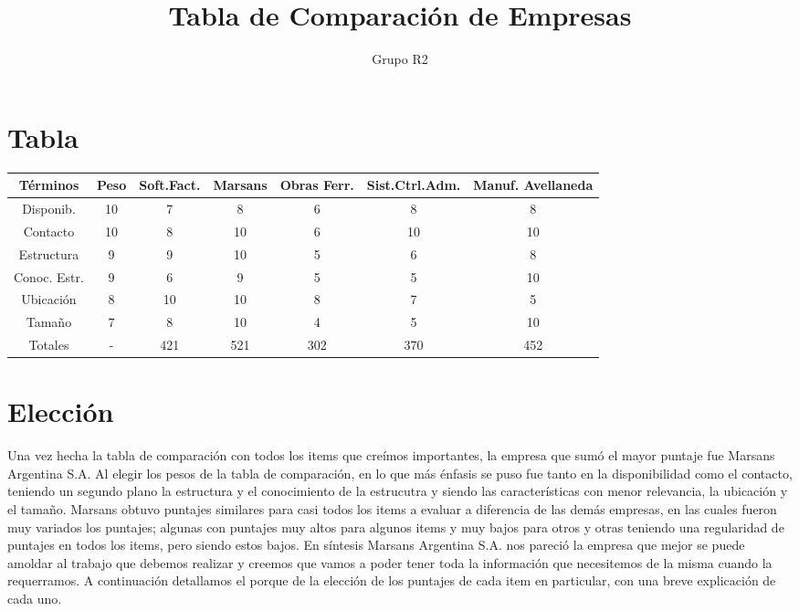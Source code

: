 \documentclass[12pt,a4paper,spanish]{article}
\begin{document}
 

\pagestyle{plain}
\title{Tabla de Comparaci\'{o}n de Empresas} 
\author{Grupo R2} 
\maketitle 
\newpage
\tableofcontents
\newpage
\section{Tabla}
\small
\begin{center}
\begin{tabular}{|| c | c | c | c | c | c | c ||}
\hline
\hline
T\'{e}rminos & Peso & Soft.Fact. & Marsans & Obras Ferr. & Sist.Ctrl.Adm. & Manuf. Avellaneda\\
\hline
Disponib.  & 10 & 7 & 8 & 6 & 8 & 8 \\
\hline
Contacto   & 10 & 8 & 10 & 6 & 10 & 10 \\
\hline
Estructura & 9 & 9 & 10 & 5 & 6 & 8 \\
\hline
Conoc. Estr. & 9 & 6 & 9 & 5 & 5 & 10 \\
\hline
Ubicaci\'{o}n & 8 & 10 & 10 & 8 & 7 & 5 \\
\hline
Tama\~{n}o   & 7 & 8 & 10 & 4 & 5 & 10 \\
\hline
\hline
Totales & - & 421 & 521 & 302 & 370 & 452 \\
\hline

\end{tabular}
\end{center}

\section{Elecci\'on}
Una vez hecha la tabla de comparaci\'{o}n con todos los items que cre\'imos importantes, la empresa que sum\'o el mayor puntaje fue Marsans Argentina S.A.
Al elegir los pesos de la tabla de comparaci\'{o}n, en lo que m\'as \'enfasis se puso fue tanto en la disponibilidad como el contacto, teniendo un segundo plano la estructura y el conocimiento de la estrucutra y siendo las caracter\'isticas con menor relevancia, la ubicaci\'on y el tama\~no.
Marsans obtuvo puntajes similares para casi todos los items a evaluar a diferencia de las dem\'{a}s empresas, en las cuales fueron muy variados los puntajes; algunas con puntajes muy altos para algunos items y muy bajos para otros y otras teniendo una regularidad de puntajes en todos los items, pero siendo estos bajos.
En s\'{i}ntesis Marsans Argentina S.A. nos pareci\'{o} la empresa que mejor se puede amoldar al trabajo que debemos realizar y creemos que vamos a poder tener toda la informaci\'{o}n que necesitemos de la misma cuando la requerramos.
A continuaci\'{o}n detallamos el porque de la elecci\'{o}n de los puntajes de cada item en particular, con una breve explicaci\'{o}n de cada uno.
\end{document}

